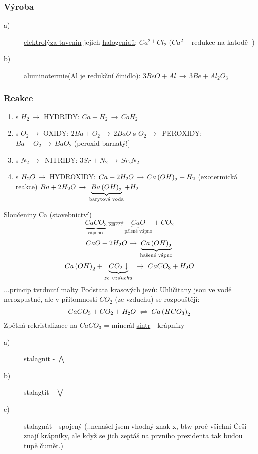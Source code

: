     \subsubsection{Výroba}
        \begin{description}
            \item[a)] \underline{elektrolýza tavenin} jejich \underline{halogenidů}: \textbf{\(Ca^{2+}Cl_2\)} ($Ca^{2+}$ redukce na katodě$^-$)
            \item[b)] \underline{aluminotermie}(Al je redukční činidlo): \(3BeO + Al \,\to\, 3Be + Al_2 O_3\)
        \end{description}
    \subsubsection{Reakce}
    \begin{enumerate}
        \item s $H_2 \,\to$ HYDRIDY: \tab $Ca + H_2 \,\to\, CaH_2$
        \item s $O_2 \,\to$ OXIDY: \tab $2Ba + O_2 \,\to\, 2BaO$
            \newline s $O_2 \,\to\,$ PEROXIDY: \tab $Ba + O_2 \,\to\, BaO_2$ (peroxid barnatý!)
        \item s $N_2 \,\to\,$ NITRIDY: \tab $3Sr + N_2 \,\to\, Sr_3 N_2$
        \item s $H_2O \,\to\,$ HYDROXIDY: \tab $Ca+2H_2O \,\to\, Ca \left( OH \right) _2 + H_2$ (exotermická reakce)
            \newline \tab\tab $Ba + 2H_2O \,\to\, \underbrace{Ba \left( OH \right) _2}_\text{barytová voda} + H_2$ 
    \end{enumerate}
    Sloučeniny Ca (stavebnictví)
    \[\underbrace{CaCO_3}_\text{vápenec} \,\overrightarrow{\, _{800^\circ C} \,} \, \underbrace{CaO}_\text{pálené vápno} + CO_2\]
    \newline
    \[CaO + 2H_2O \,\to\, \underbrace{Ca \left(OH\right)_2}_\text{hašené vápno}\]
    \newline
    \[Ca\left(OH\right)_2 + \underbrace{CO_2 \downarrow}_{ze~vzduchu} ~\to~ CaCO_3 + H_2O\] ...princip tvrdnutí malty
    \newline \newline
    \underline{Podstata krasových jevů:} Uhličitany jsou ve vodě nerozpustné, ale v přítomnosti $CO_2$ (ze vzduchu) se rozpouštějí:
    \[CaCO_3 + CO_2 + H_2O ~\rightleftharpoons ~ Ca \left( HCO_3 \right)_2 \]
    Zpětná rekristalizace na $CaCO_3$ = minerál \underline{sintr} - krápníky
    \begin{description}
        \item[a)] stalagnit - $\bigwedge$
        \item[b)] stalagtit - $\bigvee$
        \item[c)] stalagnát - spojený \tiny{(..nenašel jsem vhodný znak x, btw proč všichni Češi znají krápníky, ale když se jich zeptáš na prvního prezidenta tak budou tupě čumět.)}
    \end{description}

